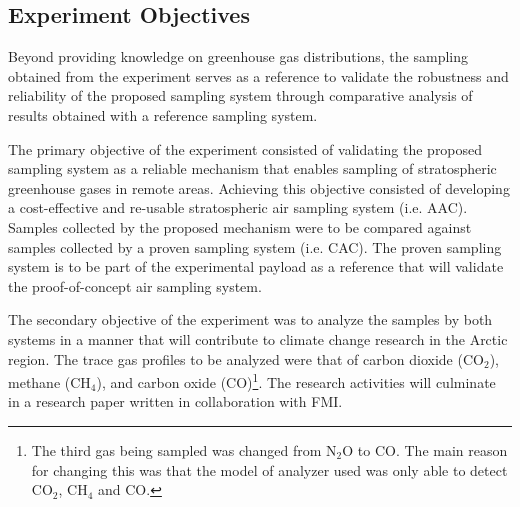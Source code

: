 \subsection{Experiment Objectives}

Beyond providing knowledge on greenhouse gas distributions, the sampling obtained from the experiment serves as a reference to validate the robustness and reliability of the proposed sampling system through comparative analysis of results obtained with a reference sampling system.

The primary objective of the experiment consisted of validating the proposed sampling system as a reliable mechanism that enables sampling of stratospheric greenhouse gases in remote areas. Achieving this objective consisted of developing a cost-effective and re-usable stratospheric air sampling system (i.e. AAC). Samples collected by the proposed mechanism were to be compared against samples collected by a proven sampling system (i.e. CAC). The proven sampling system is to be part of the experimental payload as a reference that will validate the proof-of-concept air sampling system.

The secondary objective of the experiment was to analyze the samples by both systems in a manner that will contribute to climate change research in the Arctic region. The trace gas profiles to be analyzed were that of carbon dioxide (CO$_{2}$), methane (CH$_{4}$), and carbon oxide (CO)\footnote{The third gas being sampled was changed from N$_{2}$O to CO. The main reason for changing this was that the model of analyzer used was only able to detect CO$_{2}$, CH$_{4}$ and CO.\label{fn:ChangeN2OtoCO}}. The research activities will culminate in a research paper written in collaboration with FMI.


